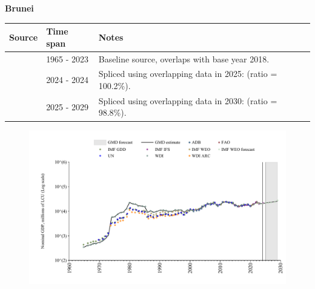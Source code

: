 \documentclass[12pt,a4paper,landscape]{article}
\begin{document}
\begin{adjustbox}{max totalsize={\paperwidth}{\paperheight},center}
\begin{minipage}[t][\textheight][t]{\textwidth}
\vspace*{0.5cm}
{}
\begin{center}
{\Large\bfseries Brunei}
\end{center}
\vspace{0.5cm}
\begin{table}[H]
\centering
\small
\begin{tabular}{|l|l|l|}
\hline
\textbf{Source} & \textbf{Time span} & \textbf{Notes} \\
\hline
\rowcolor{white}\cite{WDI}& 1965 - 2023 &Baseline source, overlaps with base year 2018.\\
\rowcolor{lightgray}\cite{IMF_IFS}& 2024 - 2024 &Spliced using overlapping data in 2025: (ratio = 100.2\%).\\
\rowcolor{white}\cite{IMF_WEO_forecast}& 2025 - 2029 &Spliced using overlapping data in 2030: (ratio = 98.8\%).\\
\hline
\end{tabular}
\end{table}
\begin{figure}[H]
\centering
\includegraphics[width=\textwidth,height=0.6\textheight,keepaspectratio]{graphs/BRN_nGDP.pdf}
\end{figure}
\end{minipage}
\end{adjustbox}
\end{document}
